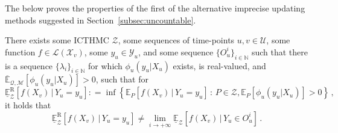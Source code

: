 \documentclass[twoside,11pt]{article}
\newcommand{\nats}{\mathbb{N}}
\newcommand{\states}{\mathcal{X}}
\newcommand{\observs}{\mathcal{Y}}
\newcommand{\uexp}{\overline{\mathbb{E}}_{\rateset,\mathcal{M}}}
\newcommand{\gambles}{\mathcal{L}}
\newcommand{\rateset}{\mathcal{Q}}
\newcommand{\coloneqq}{:\!=}
\begin{document}
The below proves the properties of the first of the alternative imprecise updating methods suggested in Section~\ref{subsec:uncountable}.
\begin{proposition}
There exists some ICTHMC $\mathcal{Z}$, some sequences of time-points $u,v\in\mathcal{U}$, some function $f\in\gambles(\states_v)$, some $y_u\in\observs_u$, and some sequence $\{O_u^i\}_{i\in\nats}$ such that there is a sequence $\{\lambda_i\}_{i\in\nats}$ for which $\phi_u(y_u\vert X_u)$ exists, is real-valued, and $\uexp[\phi_u(y_u\vert X_u)]>0$, such that for
\begin{equation*}
\underline{\mathbb{E}}_\mathcal{Z}^\mathrm{R}[f(X_v)\,\vert\, Y_u=y_u] \coloneqq \inf\left\{ \mathbb{E}_P[f(X_v)\,\vert\,Y_u=y_u]\,:\,P\in\mathcal{Z}, \mathbb{E}_P[\phi_u(y_u\vert X_u)]>0  \right\}\,,
\end{equation*}
it holds that
\begin{equation*}
\underline{\mathbb{E}}_\mathcal{Z}^\mathrm{R}[f(X_v)\,\vert\, Y_u=y_u] \neq \lim_{i\to+\infty} \underline{\mathbb{E}}_\mathcal{Z}[f(X_v)\,\vert\, Y_u\in O_u^i]\,.
\end{equation*}
\end{proposition}
\end{document}
